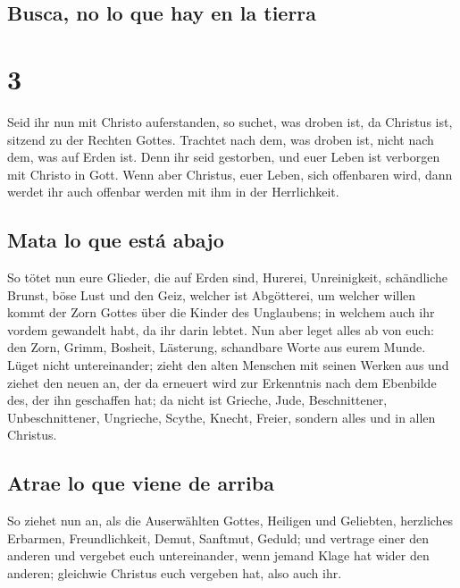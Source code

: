 \hypertarget{busca-no-lo-que-hay-en-la-tierra}{%
\subsection{Busca, no lo que hay en la
tierra}\label{busca-no-lo-que-hay-en-la-tierra}}

\hypertarget{section-2}{%
\section{3}\label{section-2}}

 Seid ihr nun mit Christo auferstanden, so suchet, was
droben ist, da Christus ist, sitzend zu der Rechten Gottes.
 Trachtet nach dem, was droben ist, nicht nach dem, was
auf Erden ist.  Denn ihr seid gestorben, und euer Leben
ist verborgen mit Christo in Gott.  Wenn aber Christus,
euer Leben, sich offenbaren wird, dann werdet ihr auch offenbar werden
mit ihm in der Herrlichkeit.

\hypertarget{mata-lo-que-estuxe1-abajo}{%
\subsection{Mata lo que está abajo}\label{mata-lo-que-estuxe1-abajo}}

 So tötet nun eure Glieder, die auf Erden sind, Hurerei,
Unreinigkeit, schändliche Brunst, böse Lust und den Geiz, welcher ist
Abgötterei,  um welcher willen kommt der Zorn Gottes über
die Kinder des Unglaubens;  in welchem auch ihr vordem
gewandelt habt, da ihr darin lebtet.  Nun aber leget alles
ab von euch: den Zorn, Grimm, Bosheit, Lästerung, schandbare Worte aus
eurem Munde.  Lüget nicht untereinander; zieht den alten
Menschen mit seinen Werken aus  und ziehet den neuen an,
der da erneuert wird zur Erkenntnis nach dem Ebenbilde des, der ihn
geschaffen hat;  da nicht ist Grieche, Jude,
Beschnittener, Unbeschnittener, Ungrieche, Scythe, Knecht, Freier,
sondern alles und in allen Christus.

\hypertarget{atrae-lo-que-viene-de-arriba}{%
\subsection{Atrae lo que viene de
arriba}\label{atrae-lo-que-viene-de-arriba}}

 So ziehet nun an, als die Auserwählten Gottes, Heiligen
und Geliebten, herzliches Erbarmen, Freundlichkeit, Demut, Sanftmut,
Geduld;  und vertrage einer den anderen und vergebet euch
untereinander, wenn jemand Klage hat wider den anderen; gleichwie
Christus euch vergeben hat, also auch ihr.

